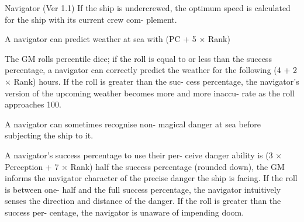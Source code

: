 \begin{Chapter}{Navigator (Ver 1.1)}
If  the  ship  is  undercrewed,  the  optimum  speed  is 
calculated  for  the  ship  with  its  current  crew  com-
plement. 

A navigator can predict weather at sea with (PC 
+ 5 × Rank)%

The GM rolls percentile dice; if the roll is equal to 
or less than the success percentage, a navigator can 
correctly predict the weather for the following (4 + 
2 × Rank) hours. If the roll is greater than the suc-
cess  percentage,  the  navigator’s  version  of  the 
upcoming weather becomes more and more inaccu-
rate as the roll approaches 100. 

A  navigator  can  sometimes  recognise  non-
magical danger at sea before subjecting the ship 
to it. 

A  navigator’s  success  percentage  to  use  their  per-
ceive  danger  ability  is  (3  ×  Perception  +  7  × 
Rank)%
half  the  success  percentage  (rounded  down),  the 
GM  informs the  navigator  character  of  the  precise 
danger the ship is facing. If the roll is between one-
half  and  the  full  success percentage,  the  navigator 
intuitively  senses  the  direction  and distance  of  the 
danger.  If  the  roll  is  greater  than  the  success  per-
centage,  the  navigator  is  unaware  of  impending 
doom. 

\end{Chapter}
